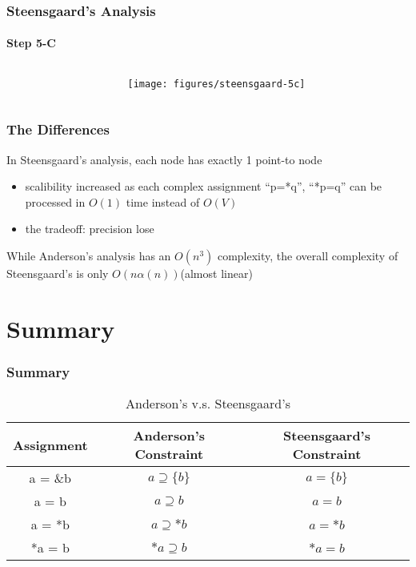 \documentclass[]{beamer}
\begin{document}
\begin{frame}
  \frametitle{Steensgaard's Analysis}
  \framesubtitle{Step 5-C}
  \begin{columns}
    \begin{column}{.4\textwidth}
      
      
    \end{column}
    \begin{column}{.6\textwidth}
      \texttt{[image: figures/steensgaard-5c]}
    \end{column}
  \end{columns}
\end{frame}

\begin{frame}
  \frametitle{The Differences}
  In Steensgaard's analysis, each node has \alert{exactly 1} point-to node
  \begin{itemize}
    \item scalibility increased as each complex assignment ``p=*q'', ``*p=q'' can be processed in $O(1)$ time
      instead of $O(V)$
    \item the tradeoff: precision lose
  \end{itemize}
  \pause
  While Anderson's analysis has an $O(n^3)$ complexity, the overall complexity of
  Steensgaard's is only $O(n\alpha(n))$(almost linear)
\end{frame}

\section{Summary}
\frame{\tableofcontents[currentsection]}

\begin{frame}
  \frametitle{Summary}
  \begin{table}
    \begin{tabular}{|c|c|c|}
      \hline
      Assignment & Anderson's Constraint & Steensgaard's Constraint\\
      \hline
      a = \&b & $a \supseteq \{b\}$ & $a = \{b\}$\\
      a = b & $a \supseteq b$ & $a = b$\\
      a = *b & $a \supseteq *b$ & $a = *b$ \\
      *a = b & $*a \supseteq b$ & $*a = b$\\
      \hline
    \end{tabular}
    \caption{Anderson's v.s. Steensgaard's}
  \end{table}
\end{frame}
\end{document}
